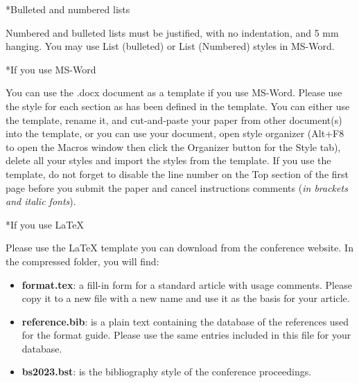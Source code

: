 \documentclass[twocolumn, a4paper,10pt]{article}
\makeatletter
\renewcommand\section{\@startsection{section}{1}{\z@}{3pt}{3pt}{\normalfont\large\bfseries}}
\renewcommand\subsection{\@startsection{subsection}{1}{\z@}{\z@}{\z@}{\normalfont\normalsize\bfseries}}
\renewcommand\subsection{\@startsection{subsection}{1}{\z@}{\z@}{0.1pt}{\normalfont\normalsize\bfseries}}
\makeatother
\begin{document}
\subsection*{Bulleted and numbered lists}

Numbered and bulleted lists must be justified, with no indentation, and 5 mm hanging. You may use List (bulleted) or List (Numbered) styles in MS-Word.

\section*{If you use MS-Word}

You can use the .docx document as a template if you use MS-Word. Please use the style for each section as has been defined in the template. You can either use the template, rename it, and cut-and-paste your paper from other document(s) into the template, or you can use your document, open style organizer (Alt+F8 to open the Macros window then click the Organizer button for the Style tab), delete all your styles and import the styles from the template.
If you use the template, do not forget to disable the line number on the Top section of the first page before you submit the paper and cancel instructions comments (\textit{in brackets and italic fonts}).

\section*{If you use \LaTeX{}}

Please use the \LaTeX{} template you can download from the conference website. In the compressed folder, you will find:
\begin{itemize}
\item \textbf{format.tex}: a fill-in form for a standard article with usage comments. Please copy it to a new file with a new name and use it as the basis for your article.
\item \textbf{reference.bib}: is a plain text containing the database of the references used for the format guide. Please use the same entries included in this file for your database.
\item \textbf{bs2023.bst}: is the bibliography style of the conference proceedings. 
\end{itemize}
\end{document}
